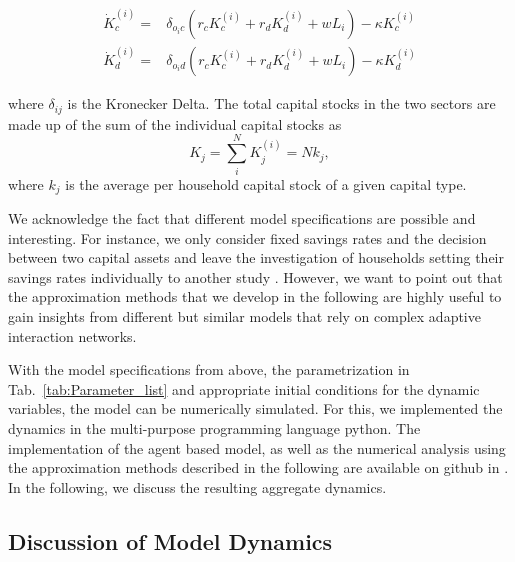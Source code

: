 \begin{align}
	\dot{K}_c^{(i)} =& \delta_{o_ic} \left( r_c K_c^{(i)} + r_d K_d^{(i)} + w L_i \right) - \kappa K_c^{(i)} \label{eq:clean_investment2}\\
	\dot{K}_d^{(i)} =& \delta_{o_id} \left( r_c K_c^{(i)} + r_d K_d^{(i)} + w L_i \right) - \kappa K_d^{(i)} \label{eq:dirty_investment2}
\end{align}

where $\delta_{ij}$ is the Kronecker Delta. The total capital stocks in the two sectors are made up of the sum of the individual capital stocks as
\begin{equation}
K_j = \sum_i^N K_j^{(i)} = N k_j,
\end{equation}
where $k_j$ is the average per household capital stock of a given capital type.

We acknowledge the fact that different model specifications are possible and interesting.
For instance, we only consider fixed savings rates and the decision between two capital assets and leave the investigation of households setting their savings rates individually to another study \cite{Asano2018}.
However, we want to point out that the approximation methods that we develop in the following are highly useful to gain insights from different but similar models that rely on complex adaptive interaction networks.

With the model specifications from above, the parametrization in Tab.~\ref{tab:Parameter_list} and appropriate initial conditions for the dynamic variables, the model can be numerically simulated.
For this, we implemented the dynamics in the multi-purpose programming language python. The implementation of the agent based model, as well as the numerical analysis using the approximation methods described in the following are available on github in \cite{kolb2018}.
In the following, we discuss the resulting aggregate dynamics.


\subsection{Discussion of Model Dynamics}

